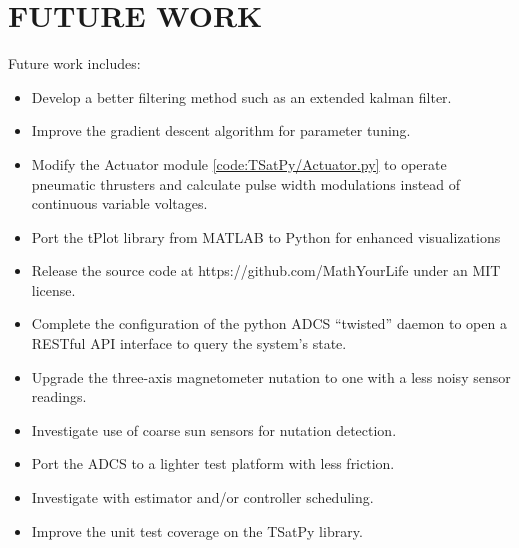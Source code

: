 \section{FUTURE WORK}
\label{chap:FutureWork}


Future work includes:

\begin{itemize}
\item Develop a better filtering method such as an extended kalman filter.
\item Improve the gradient descent algorithm for parameter tuning.
\item Modify the Actuator module \ref{code:TSatPy/Actuator.py} to operate pneumatic thrusters and calculate pulse width modulations instead of continuous variable voltages.
\item Port the tPlot library from MATLAB to Python for enhanced visualizations
\item Release the source code at https://github.com/MathYourLife under an MIT license.
\item Complete the configuration of the python ADCS ``twisted'' daemon to open a RESTful API interface to query the system's state.
\item Upgrade the three-axis magnetometer nutation to one with a less noisy sensor readings.
\item Investigate use of coarse sun sensors for nutation detection.
\item Port the ADCS to a lighter test platform with less friction.
\item Investigate with estimator and/or controller scheduling.
\item Improve the unit test coverage on the TSatPy library.
\end{itemize}

